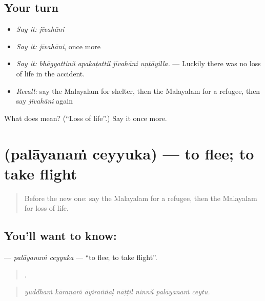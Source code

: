\subsection*{Your turn}
\begin{itemize}
\raggedright
  \item \emph{Say it:} \emph{jīvahāni}
  \item \emph{Say it:} \emph{jīvahāni}, once more
  \item \emph{Say it:} \emph{bhāgyattinŭ apakaṭattil jīvahāni uṇṭāyilla.} — Luckily there was no loss of life in the accident.
  \item \emph{Recall:} say the Malayalam for shelter, then the Malayalam for a refugee, then say \emph{jīvahāni} again
\end{itemize}

\begin{tcolorbox}[breakable,colback=teal!4,colframe=teal!35!black,title={Before you move on}]
What does  mean? (\textquotedblleft{}Loss of life\textquotedblright{}.) Say it once more.
\end{tcolorbox}
\section[\texorpdfstring{\ml{പലായനം} \ml{ചെയ്യുക} (palāyanaṁ ceyyuka)}{പലായനം ചെയ്യുക (palāyanaṁ ceyyuka)}]{  (palāyanaṁ ceyyuka) — to flee; to take flight}

\label{lesson:ML-C378-palayanam-ceyyuka}



\begin{quote}
Before the new one: say the Malayalam for a refugee, then the Malayalam for loss of life.
\end{quote}

\subsection*{You'll want to know:  }
\textbf{ } — \emph{palāyanaṁ ceyyuka} — \textquotedblleft{}to flee; to take flight\textquotedblright{}.

\begin{quote}
      .
\end{quote}

\begin{quote}
\emph{yuddhaṁ kāraṇaṁ āyiraṅṅaḷ nāṭṭil ninnŭ palāyanaṁ ceytu.}
\end{quote}

